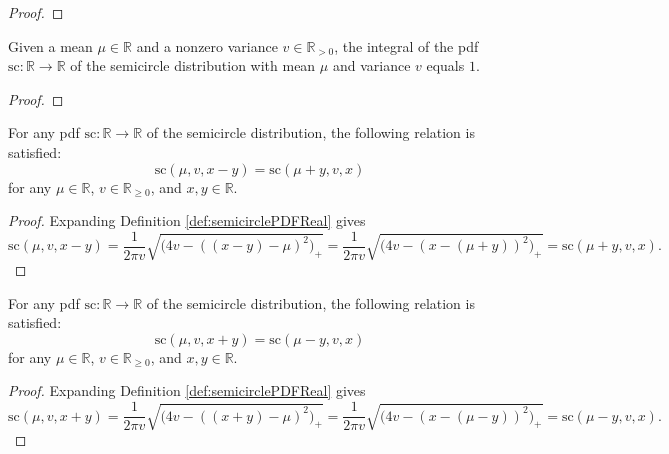 \begin{proof}
\end{proof}
\begin{lemma}\label{lem:integral_semicirclePDFReal_eq_one}
    Given a mean $\mu \in \mathbb{R}$ and a nonzero variance $v \in \mathbb{R}_{> 0}$, the integral of the pdf $\mathrm{sc} : \mathbb{R} \rightarrow \mathbb{R}$
    of the semicircle distribution with mean $\mu$ and variance $v$ equals $1$.
\end{lemma}
\begin{proof}
\end{proof}
\begin{lemma}\label{lem:semicirclePDFReal_sub}
    \leanok
    For any pdf $\mathrm{sc} : \mathbb{R} \rightarrow \mathbb{R}$
    of the semicircle distribution, the following relation is satisfied:
    \[
    \mathrm{sc}(\mu,v,x-y) = \mathrm{sc}(\mu+y,v,x)
    \]
    for any $\mu \in \mathbb{R}$, $v \in \mathbb{R}_{\geq 0}$, and $x,y \in \mathbb{R}$.
\end{lemma}
\begin{proof}
   Expanding Definition \ref{def:semicirclePDFReal} gives
   \[
   \mathrm{sc}(\mu,v,x-y)
   = \frac{1}{2πv} \sqrt{\bigl( 4v - ( (x - y) - μ)^2 \bigl)_+}
   = \frac{1}{2πv} \sqrt{\bigl( 4v - (x - (μ + y))^2 \bigl)_+}
   = \mathrm{sc}(\mu+y,v,x).
   \]
\end{proof}
\begin{lemma}\label{lem:semicirclePDFReal_add}
    \leanok
    For any pdf $\mathrm{sc} : \mathbb{R} \rightarrow \mathbb{R}$
    of the semicircle distribution, the following relation is satisfied:
    \[
    \mathrm{sc}(\mu,v,x+y) = \mathrm{sc}(\mu-y,v,x)
    \]
    for any $\mu \in \mathbb{R}$, $v \in \mathbb{R}_{\geq 0}$, and $x,y \in \mathbb{R}$.
\end{lemma}
\begin{proof}
   Expanding Definition \ref{def:semicirclePDFReal} gives
   \[
   \mathrm{sc}(\mu,v,x+y)
   = \frac{1}{2πv} \sqrt{\bigl( 4v - ( (x + y) - μ)^2 \bigl)_+}
   = \frac{1}{2πv} \sqrt{\bigl( 4v - (x - (μ - y))^2 \bigl)_+}
   = \mathrm{sc}(\mu-y,v,x).
   \]
\end{proof}
